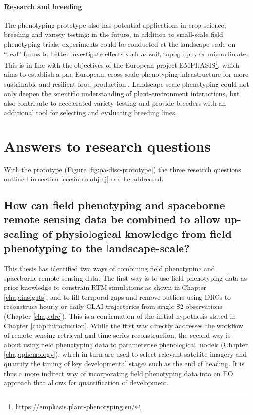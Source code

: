 \paragraph{Research and breeding}
The phenotyping prototype also has potential applications in crop science, breeding and variety testing: in the future, in addition to small-scale field phenotyping trials, experiments could be conducted at the landscape scale on ``real'' farms to better investigate effects such as soil, topography or microclimate. This is in line with the objectives of the European project EMPHASIS\footnote{\url{https://emphasis.plant-phenotyping.eu/}}, which aims to establish a pan-European, cross-scale phenotyping infrastructure for more sustainable and resilient food production \citep{pieruschka_plant_2019}. Landscape-scale phenotyping could not only deepen the scientific understanding of plant-environment interactions, but also contribute to accelerated variety testing and provide breeders with an additional tool for selecting and evaluating breeding lines.

\section{Answers to research questions}
With the prototype (Figure \ref{fig:oa-disc-prototype}) the three research questions outlined in section \ref{sec:intro-obj-rj} can be addressed.

\subsection{How can field phenotyping and spaceborne remote sensing data be combined to allow up-scaling of physiological knowledge from field phenotyping to the landscape-scale?}
This thesis has identified two ways of combining field phenotyping and spaceborne remote sensing data. The first way is to use field phenotyping data as prior knowledge to constrain \gls{RTM} simulations as shown in Chapter \ref{chap:insights}, and to fill temporal gaps and remove outliers using \gls{DRC}s to reconstruct hourly or daily \gls{GLAI} trajectories from single \gls{S2} observations (Chapter \ref{chap:drc}). This is a confirmation of the initial hypothesis stated in Chapter \ref{chap:introduction}. While the first way directly addresses the workflow of remote sensing retrieval and time series reconstruction, the second way is about using field phenotyping data to parameterise phenological models (Chapter \ref{chap:phemology}), which in turn are used to select relevant satellite imagery and quantify the timing of key developmental stages such as the end of heading. It is thus a more indirect way of incorporating field phenotyping data into an \gls{EO} approach that allows for quantification of development.

